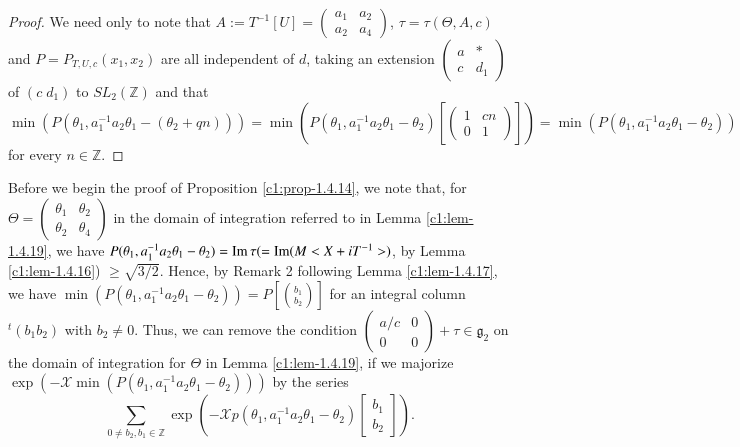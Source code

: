 \begin{proof}
We need only to note that $A:=T^{-1}[U]=\left(\begin{smallmatrix}
  a_{1} & a_{2}\\ a_{2} & a_{4}
\end{smallmatrix}\right)$, $\tau=\tau(\Theta, A,c)$ and
$P=P_{T,U,c}(x_{1},x_{2})$ are all independent of $d$, taking an
extension $\left(\begin{smallmatrix} a & \ast\\ c & d_{1}
\end{smallmatrix}\right)$ of $(c \; d_{1})$ to $SL_{2}(\mathbb{Z})$ and
that
$\min(P(\theta_{1},a^{-1}_{1}a_{2}\theta_{1}-(\theta_{2}+qn)))=\min
(P(\theta_{1},a^{-1}_{1}a_{2}\theta_{1}-\theta_{2})\left[\left(\begin{smallmatrix}
    1 & cn\\ 0 & 1
  \end{smallmatrix}\right)\right])=\min(P(\theta_{1},a^{-1}_{1}a_{2}\theta_{1}-\theta_{2}))$
for every $n\in\mathbb{Z}$.
\end{proof}

Before we begin the proof of Proposition \ref{c1:prop-1.4.14}, we note
that, for $\Theta=\left(\begin{smallmatrix} \theta_{1} &
  \theta_{2}\\ \theta_{2} & \theta_{4}
\end{smallmatrix}\right)$ in the domain of integration referred to in
Lemma \ref{c1:lem-1.4.19}, we have
$P(\theta_{1},a^{-1}_{1}a_{2}\theta_{1}-\theta_{2})=\operatorname{Im}
\tau(=\operatorname{Im}(M<X+iT^{-1}>)$, by Lemma \ref{c1:lem-1.4.16}) $\geq
\sqrt{3/2}$. Hence, by Remark 2 following Lemma \ref{c1:lem-1.4.17}, we
have $\min
(P(\theta_{1},a^{-1}_{1}a_{2}\theta_{1}-\theta_{2}))=P[\binom{b_{1}}{b_{2}}]$
for an integral column ${}^{t}(b_{1}b_{2})$ with $b_{2}\neq 0$. Thus,
we can remove the condition $\left(\begin{smallmatrix} a/c & 0\\ 0 & 0
\end{smallmatrix}\right)+\tau \in\mathfrak{g}_{2}$ on the domain of
integration for $\Theta$ in Lemma \ref{c1:lem-1.4.19}, if we majorize
$\exp(-\mathscr{X}\min
(P(\theta_{1},a^{-1}_{1}a_{2}\theta_{1}-\theta_{2})))$ by the series
$$
\sum_{0\neq b_{2},
  b_{1}\in\mathbb{Z}}\exp(-\mathscr{X}p(\theta_{1},a^{-1}_{1}a_{2}\theta_{1}-\theta_{2})\left[\begin{smallmatrix}
    b_{1}\\ b_{2}  \end{smallmatrix}\right]).
$$

